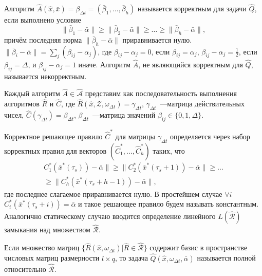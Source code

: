 \begin{Def}
	Алгоритм $\hat A(\hat{x},\bar{x})=\beta_{\Delta{t}}=(\bar{\beta}_1,\dots,\bar{\beta}_h)$ называется корректным для задачи $\hat{Q}$, если выполнено условие
	\begin{equation}
		\|\bar{\beta}_1-\bar{\alpha}\|\geqslant\|\bar{\beta}_2-\bar{\alpha}\|\geqslant\dots\geqslant\|\bar{\beta}_h-\bar{\alpha}\|,
	\end{equation}
	причём последняя норма $\|\bar{\beta}_h-\bar{\alpha}\|$ приравнивается нулю.
	$\|\bar{\beta}_i-\bar{\alpha}\|=
	\sum_j{(\beta_{ij}-\alpha_j)}$, где $\beta_{ij}-\alpha_j=0$, если $\beta_{ij}=\alpha_j$, $\beta_{ij}-\alpha_j=\frac{1}{2}$, если $\beta_{ij}=\Delta$, и $\beta_{ij}-\alpha_j=1$ иначе. Алгоритм $\hat A$, не являющийся корректным для $\hat{Q}$, называется некорректным.
\end{Def}

\begin{Pred}
	\label{st:decompositon_dyn}
	Каждый алгоритм $\hat A\in\hat{\mathcal A}$ представим как последовательность выполнения алгоритмов $\hat{R}$ и $\hat{C}$, где $\hat{R}(\hat{x}, \mathcal{Z}, \omega_{\Delta{t}})=\gamma_{\Delta{t}}$, $\gamma_{\Delta{t}}$~---матрица действительных чисел, $\hat{C}(\gamma_{\Delta{t}})=\beta_{\Delta{t}}$, $\beta_{\Delta{t}}$~---матрица значений $\beta_{ij}\in\{0,1,\Delta\}$.
\end{Pred}

Корректное решающее правило $\hat{C}^*$ для матрицы $\gamma_{\Delta{t}}$ определяется через набор корректных правил для векторов $(\hat{C}_1^*, \dots, \hat{C}_h^*)$ таких, что 
\begin{eqnarray}
		C_1^*(\bar{x}^*(\tau_s))-\bar{\alpha}\|\geqslant\|C_2^*(\bar{x}^*(\tau_s+1))-\bar{\alpha}\|\geqslant\dots\nonumber\\
		\geqslant\|C_h^*(\bar{x}^*(\tau_s+h-1))-\bar{\alpha}\|,
\end{eqnarray}
где последнее слагаемое приравнивается нулю.  В простейшем случае $\forall{i}$ $C_i^*(\bar{x}^*(\tau_s+i))=\bar{\alpha}$ и такое решающее правило будем называть константным. Аналогично статическому случаю вводится определение линейного $L(\hat{\mathcal R})$ замыкания над множеством $\hat{\mathcal R}$. 

\begin{Def}
	Если множество матриц $\{\hat R(\hat x,\omega_{\Delta t})|\hat R\in\hat{\mathcal R}\}$ содержит базис в пространстве числовых матриц размерности $l\times q$, то задача $\hat Q(\hat x,\omega_{\Delta t},\bar{\alpha})$ называется полной относительно $\hat{\mathcal R}$.
\end{Def}

